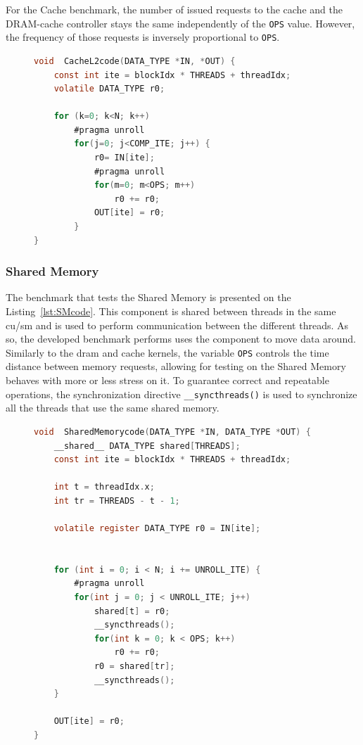 For the Cache benchmark, the number of issued requests to the cache and the DRAM-cache controller stays the same independently of the \texttt{OPS} value. However, the frequency of those requests is inversely proportional to \texttt{OPS}.

\begin{figure}[h]
\begin{lstlisting}[language=C, caption=CacheL2 Benchmark Code, label=lst:CacheL2bench, basicstyle=\footnotesize\ttfamily,abovecaptionskip=0pt, captionpos=b]
void  CacheL2code(DATA_TYPE *IN, *OUT) {
    const int ite = blockIdx * THREADS + threadIdx;
    volatile DATA_TYPE r0;
    
    for (k=0; k<N; k++) 
        #pragma unroll
        for(j=0; j<COMP_ITE; j++) {
            r0= IN[ite];
            #pragma unroll
            for(m=0; m<OPS; m++)    
                r0 += r0;
            OUT[ite] = r0;
        }
}
\end{lstlisting}
\end{figure}

\subsubsection{Shared Memory}

The benchmark that tests the Shared Memory is presented on the Listing~\ref{lst:SMcode}. This component is shared between threads in the same \acrshort{cu}/\acrshort{sm} and is used to perform communication between the different threads. As so, the developed benchmark performs uses the component to move data around. Similarly to the \acrshort{dram} and cache kernels, the variable \texttt{OPS} controls the time distance between memory requests, allowing for testing on the Shared Memory behaves with more or less stress on it. To guarantee correct and repeatable operations, the synchronization directive \texttt{\_\_syncthreads()} is used to synchronize all the threads that use the same shared memory.

\begin{figure}[h]
\begin{lstlisting}[language=C, caption=Shared Memory Benchmark code, label=lst:SMcode, basicstyle=\footnotesize\ttfamily, abovecaptionskip=0pt, captionpos=b]
void  SharedMemorycode(DATA_TYPE *IN, DATA_TYPE *OUT) {
    __shared__ DATA_TYPE shared[THREADS];
    const int ite = blockIdx * THREADS + threadIdx;
    
    int t = threadIdx.x;
    int tr = THREADS - t - 1;
    
    volatile register DATA_TYPE r0 = IN[ite];
    
    
    for (int i = 0; i < N; i += UNROLL_ITE) {
        #pragma unroll
        for(int j = 0; j < UNROLL_ITE; j++)  
            shared[t] = r0;
            __syncthreads();
            for(int k = 0; k < OPS; k++) 
                r0 += r0;
            r0 = shared[tr];
            __syncthreads();
    }
    
    OUT[ite] = r0;
}
\end{lstlisting}
\end{figure}

